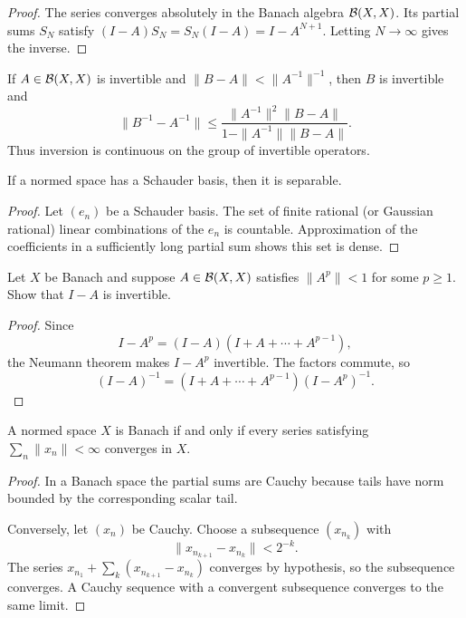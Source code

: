 \begin{proof}
The series converges absolutely in the Banach algebra $\mathcal{B}(X,X)$.  Its
partial sums $S_N$ satisfy
$(I-A)S_N=S_N(I-A)=I-A^{N+1}$.  Letting $N\to\infty$ gives the inverse.
\end{proof}

\begin{notecorollary}
If $A\in\mathcal{B}(X,X)$ is invertible and
$\|B-A\|<\|A^{-1}\|^{-1}$, then $B$ is invertible and
\[
  \|B^{-1}-A^{-1}\|
  \le
  \frac{\|A^{-1}\|^2\|B-A\|}
       {1-\|A^{-1}\|\|B-A\|}.
\]
Thus inversion is continuous on the group of invertible operators.
\end{notecorollary}

\begin{notetheorem}
If a normed space has a Schauder basis, then it is separable.
\end{notetheorem}

\begin{proof}
Let $(e_n)$ be a Schauder basis.  The set of finite rational (or Gaussian
rational) linear combinations of the $e_n$ is countable.  Approximation of
the coefficients in a sufficiently long partial sum shows this set is dense.
\end{proof}

\begin{noteexercise}
Let $X$ be Banach and suppose $A\in\mathcal{B}(X,X)$ satisfies $\|A^p\|<1$ for
some $p\ge1$.  Show that $I-A$ is invertible.
\end{noteexercise}

\begin{proof}
Since
\[
  I-A^p=(I-A)(I+A+\cdots+A^{p-1}),
\]
the Neumann theorem makes $I-A^p$ invertible.  The factors commute, so
\[
  (I-A)^{-1}=(I+A+\cdots+A^{p-1})(I-A^p)^{-1}.
\]
\end{proof}

\begin{notetheorem}
A normed space $X$ is Banach if and only if every series satisfying
$\sum_n\|x_n\|<\infty$ converges in $X$.
\end{notetheorem}

\begin{proof}
In a Banach space the partial sums are Cauchy because tails have norm bounded
by the corresponding scalar tail.

Conversely, let $(x_n)$ be Cauchy.  Choose a subsequence $(x_{n_k})$ with
\[
  \|x_{n_{k+1}}-x_{n_k}\|<2^{-k}.
\]
The series
$x_{n_1}+\sum_k(x_{n_{k+1}}-x_{n_k})$ converges by hypothesis, so the
subsequence converges.  A Cauchy sequence with a convergent subsequence
converges to the same limit.
\end{proof}


